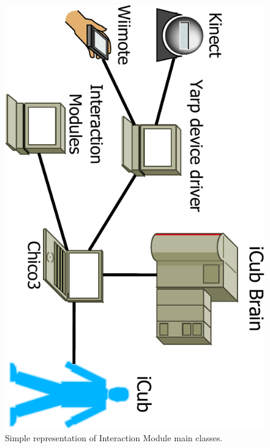 	\begin{figure}[htb]
	\begin{center}
	\includegraphics[scale=0.30,page=5,angle=90]{icubSimpleNetworkDiagram-crop.pdf}
	\end{center}
	\caption[Simple representation of the Interaction Module main classes]{Simple representation of Interaction Module main classes.} 
	\label{fig:InteractionModuleSimpleRepresentation}
	\end{figure}
	
